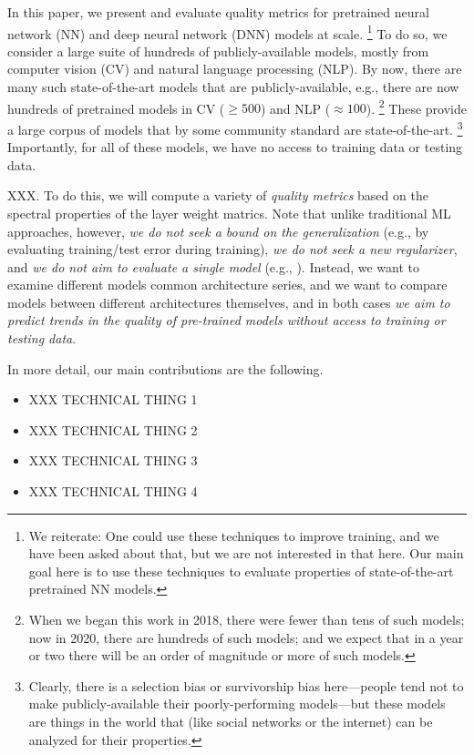 In this paper, we present and evaluate quality metrics for pretrained neural network (NN) and deep neural network (DNN) models at scale.%
\footnote{We reiterate: One could use these techniques to improve training, and we have been asked about that, but we are not interested in that here. Our main goal here is to use these techniques to evaluate properties of state-of-the-art pretrained NN models.}
To do so, we consider a large suite of hundreds of publicly-available models, mostly from computer vision (CV) and natural language processing (NLP).
%
By now, there are many such state-of-the-art models that are publicly-available, e.g., 
there are now hundreds of pretrained models in CV ($\ge 500$) and NLP ($\approx 100$).%
\footnote{When we began this work in 2018, there were fewer than tens of such models; now in 2020, there are hundreds of such models; and we expect that in a year or two there will be an order of magnitude or more of such models.}
These provide a large corpus of models that by some community standard are state-of-the-art.%
\footnote{Clearly, there is a selection bias or survivorship bias here---people tend not to make publicly-available their poorly-performing models---but these models are things in the world that (like social networks or the internet) can be analyzed for their properties.}
Importantly, for all of these models, we have no access to training data or testing data.



XXX.  
To do this, we will compute a variety of \emph{quality metrics} based on the spectral properties of the layer weight matrics.
Note that unlike traditional ML approaches, however, \emph{we do not seek a bound on the generalization} (e.g., by evaluating training/test error during training), \emph{we do not seek a new regularizer}, and \emph{we do not aim to evaluate a single model} (e.g., ). 
Instead, we want to examine different models  common architecture series, and we want to compare models between different architectures themselves, and in both cases \emph{we aim to predict trends in the quality of pre-trained models without access to training or testing data}.  

In more detail, our main contributions are the following.
\begin{itemize}
\item XXX TECHNICAL THING 1
\item XXX TECHNICAL THING 2
\item XXX TECHNICAL THING 3
\item XXX TECHNICAL THING 4
\end{itemize}


